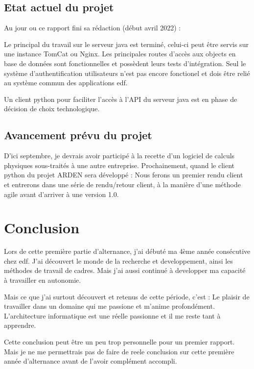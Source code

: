 \justify
\subsection{Etat actuel du projet}

Au jour ou ce rapport fini sa rédaction (début avril 2022) :

Le principal du travail sur le serveur java est terminé, celui-ci peut être servis sur une instance TomCat ou Nginx. Les principales routes d'accès aux objects en base de données sont fonctionnelles et possèdent leurs tests d'intégration. Seul le système d'authentification utilisateurs n'est pas encore fonctionel et dois être relié au système commun des applications \gls{edf}.

Un client python pour faciliter l'accès à l'API du serveur java est en phase de décision de choix technologique.

\subsection{Avancement prévu du projet}

D'ici septembre, je devrais avoir participé à la recette d'un logiciel de calculs physiques sous-traités à une autre entreprise.
Prochainement, quand le client python du projet ARDEN sera développé : Nous ferons un premier rendu client et entrerons dans une série de rendu/retour client, à la manière d'une méthode agile avant d'arriver à une version 1.0.
\clearpage

\section{Conclusion}

Lors de cette première partie d'alternance, j'ai débuté ma 4ème année consécutive chez \gls{edf}. J'ai découvert le monde de la recherche et developpement, ainsi les méthodes de travail de cadres. Mais j'ai aussi continué à developper ma capacité à travailler en autonomie.

Mais ce que j'ai surtout découvert et retenus de cette période, c'est : Le plaisir de travailler dans un domaine qui me passione et m'anime profondément. L'architecture informatique est une réelle passionne et il me reste tant à apprendre. 

Cette conclusion peut être un peu trop personnelle pour un premier rapport. Mais je ne me permettrais pas de faire de reele conclusion sur cette première année d'alternance avant de l'avoir complément accompli.